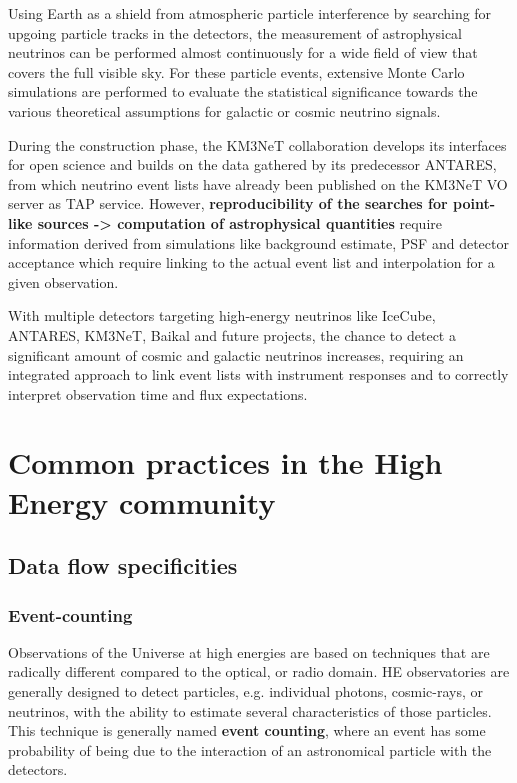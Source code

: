 \documentclass[11pt,a4paper]{ivoa}
\begin{document}
Using Earth as a shield from atmospheric particle interference by searching for upgoing particle tracks in the detectors,
the measurement of astrophysical neutrinos can be performed almost continuously for a wide field of view that covers the
full visible sky. For these particle events, extensive Monte Carlo simulations are performed to evaluate the
statistical significance towards the various theoretical assumptions for galactic or cosmic neutrino signals.

During the construction phase, the KM3NeT collaboration develops its interfaces for open science and builds on the data
gathered by its predecessor ANTARES, from which neutrino event lists have already been published on the KM3NeT VO server
as TAP service. However, {\bf reproducibility of the searches for point-like sources -> computation of astrophysical quantities}
require information derived from  simulations like background estimate, PSF and detector acceptance which require linking
to the actual event list and interpolation for a given observation.

With multiple detectors targeting high-energy neutrinos like IceCube, ANTARES, KM3NeT, Baikal and future projects, the
chance to detect a significant amount of cosmic and galactic neutrinos increases, requiring an integrated approach to
link event lists with instrument responses and to correctly interpret observation time and flux expectations.


\section{Common practices in the High Energy community}
\label{sec:vhespec}

\subsection{Data flow specificities}

\subsubsection{Event-counting}

Observations of the Universe at high energies are based on techniques that are radically different compared to the optical, or radio domain. HE observatories are generally designed to detect particles, e.g. individual photons, cosmic-rays, or neutrinos, with the ability to estimate several characteristics of those particles. This technique is generally named \textbf{event counting}, where an event has some probability of being due to the interaction of an astronomical particle with the detectors.
\end{document}
